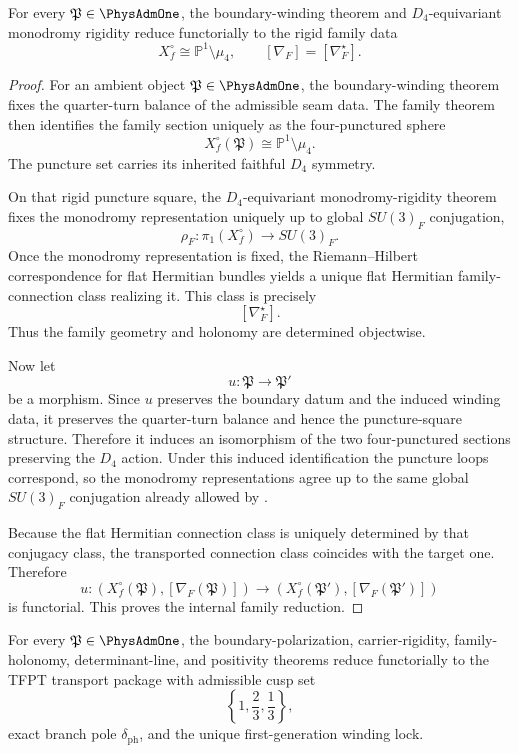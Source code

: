 \begin{theorem}
\label{prop:universal-family-reduction}
For every $\mathfrak P\in\PhysAdmOne$, the boundary-winding theorem and $D_4$-equivariant
monodromy rigidity reduce functorially to
the rigid family data
\[
X_f^\circ\cong \mathbb P^1\setminus\mu_4,
\qquad
[\nabla_F]=[\nabla_F^\star].
\]
\end{theorem}

\begin{proof}
For an ambient object $\mathfrak P\in\PhysAdmOne$, the boundary-winding theorem fixes the
quarter-turn balance of the admissible seam data. The family theorem then identifies the family
section uniquely as the four-punctured sphere
\[
X_f^\circ(\mathfrak P)\cong \mathbb P^1\setminus\mu_4.
\]
The puncture set carries its inherited faithful $D_4$ symmetry.

On that rigid puncture square, the $D_4$-equivariant monodromy-rigidity theorem fixes the
monodromy representation uniquely up to global $SU(3)_F$ conjugation,
\[
\rho_F:\pi_1(X_f^\circ)\to SU(3)_F.
\]
Once the monodromy representation is fixed, the Riemann--Hilbert correspondence for flat Hermitian
bundles yields a unique flat Hermitian family-connection class realizing it. This class is
precisely
\[
[\nabla_F^\star].
\]
Thus the family geometry and holonomy are determined objectwise.

Now let
\[
u:\mathfrak P\to \mathfrak P'
\]
be a morphism. Since $u$ preserves the boundary datum and the induced winding data, it preserves the
quarter-turn balance and hence the puncture-square structure. Therefore it induces an isomorphism
of the two four-punctured sections preserving the $D_4$ action. Under this induced identification
the puncture loops correspond, so the monodromy representations agree up to the same global
$SU(3)_F$ conjugation already allowed by .

Because the flat Hermitian connection class is uniquely determined by that conjugacy class, the
transported connection class coincides with the target one. Therefore
\[
u:(X_f^\circ(\mathfrak P),[\nabla_F(\mathfrak P)])
\longrightarrow
(X_f^\circ(\mathfrak P'),[\nabla_F(\mathfrak P')])
\]
is functorial. This proves the internal family reduction.
\end{proof}

\begin{theorem}
\label{prop:universal-transport-reduction}
For every $\mathfrak P\in\PhysAdmOne$, the boundary-polarization, carrier-rigidity,
family-holonomy, determinant-line, and positivity theorems reduce functorially to
the TFPT transport package with admissible cusp set
\[
\left\{1,\frac23,\frac13\right\},
\]
exact branch pole $\delta_{\mathrm{ph}}$, and the unique first-generation winding lock.
\end{theorem}

